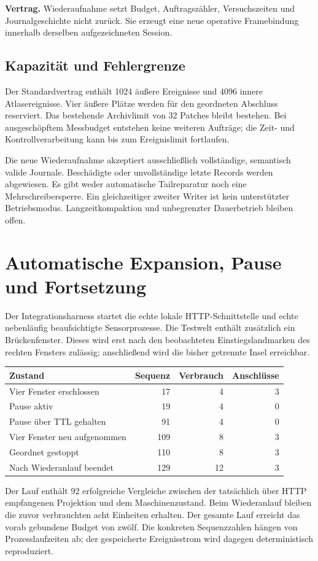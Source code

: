 \documentclass[11pt,a4paper]{article}
\newcommand{\contract}[1]{\vspace{3pt}\noindent\colorbox{pale}{\parbox{\dimexpr\linewidth-2\fboxsep}{\textbf{Vertrag.} #1}}\vspace{5pt}}
\newcommand{\nextsection}[2]{\clearpage{\color{accent}\small\textsf{#1}}\section{#2}}
\begin{document}
\contract{Wiederaufnahme setzt Budget, Auftragszähler, Versuchszeiten
und Journalgeschichte nicht zurück. Sie erzeugt eine neue operative
Framebindung innerhalb derselben aufgezeichneten Session.}

\subsection{Kapazität und Fehlergrenze}
Der Standardvertrag enthält 1024 äußere Ereignisse und 4096 innere
Atlasereignisse. Vier äußere Plätze werden für den geordneten Abschluss
reserviert. Das bestehende Archivlimit von 32 Patches bleibt bestehen.
Bei ausgeschöpftem Messbudget entstehen keine weiteren Aufträge;
die Zeit- und Kontrollverarbeitung kann bis zum Ereignislimit fortlaufen.

Die neue Wiederaufnahme akzeptiert ausschließlich vollständige,
semantisch valide Journale. Beschädigte oder unvollständige letzte
Records werden abgewiesen. Es gibt weder automatische Tailreparatur
noch eine Mehrschreibersperre. Ein gleichzeitiger zweiter Writer ist
kein unterstützter Betriebsmodus. Langzeitkompaktion und unbegrenzter
Dauerbetrieb bleiben offen.

\nextsection{37 / AKTIVER NACHWEIS}{Automatische Expansion, Pause und Fortsetzung}
Der Integrationsharness startet die echte lokale HTTP-Schnittstelle
und echte nebenläufig beaufsichtigte Sensorprozesse. Die Testwelt
enthält zusätzlich ein Brückenfenster. Dieses wird erst nach den
beobachteten Einstiegslandmarken des rechten Fensters zulässig;
anschließend wird die bisher getrennte Insel erreichbar.

\begin{center}\begin{tabular}{@{}lrrr@{}}\toprule
Zustand & Sequenz & Verbrauch & Anschlüsse\\\midrule
Vier Fenster erschlossen & 17 & 4 & 3\\
Pause aktiv & 19 & 4 & 0\\
Pause über TTL gehalten & 91 & 4 & 0\\
Vier Fenster neu aufgenommen & 109 & 8 & 3\\
Geordnet gestoppt & 110 & 8 & 3\\
Nach Wiederanlauf beendet & 129 & 12 & 3\\\bottomrule
\end{tabular}\end{center}

Der Lauf enthält 92 erfolgreiche Vergleiche zwischen der tatsächlich
über HTTP empfangenen Projektion und dem Maschinenzustand. Beim
Wiederanlauf bleiben die zuvor verbrauchten acht Einheiten erhalten.
Der gesamte Lauf erreicht das vorab gebundene Budget von zwölf.
Die konkreten Sequenzzahlen hängen von Prozesslaufzeiten ab;
der gespeicherte Ereignisstrom wird dagegen deterministisch reproduziert.
\end{document}
